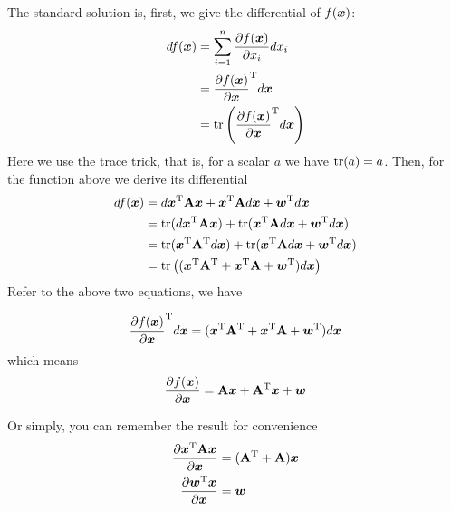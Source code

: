 \documentclass[a4paper, 12pt, answers]{exam} %
\begin{document}
\begin{questions}
\begin{solution}
	The standard solution is, first, we give the differential of $f(\bm{x})$:
	\begin{equation*}
	\begin{aligned}
	df(\bm{x}) &= \sum_{i=1}^n \frac{\partial f(\bm{x})}{\partial x_i}dx_i \\
	&= \frac{\partial f(\bm{x})}{\partial \bm{x}}^{\mathrm{T}} d\bm{x} \\
	&= \operatorname{tr} \left ( \frac{\partial f(\bm{x})}{\partial \bm{x}}^{\mathrm{T}} d\bm{x} \right )
	\end{aligned}
	\end{equation*}
	Here we use the trace trick, that is, for a scalar $a$ we have $\operatorname{tr}(a)=a$. Then, for the function above we derive its differential
	\begin{equation*}
	\begin{aligned}
	df(\bm{x}) &= d\bm{x}^{\mathrm{T}}\mathbf{A} \bm{x} + \bm{x}^{\mathrm{T}}\mathbf{A}d \bm{x} + \bm{w}^{\mathrm{T}} d \bm{x} \\
	&= \operatorname{tr}(d\bm{x}^{\mathrm{T}}\mathbf{A} \bm{x}) + \operatorname{tr}(\bm{x}^{\mathrm{T}}\mathbf{A} d \bm{x} + \bm{w}^{\mathrm{T}} d \bm{x}) \\
	&= \operatorname{tr}(\bm{x}^{\mathrm{T}}\mathbf{A}^{\mathrm{T}}d\bm{x}) + \operatorname{tr}(\bm{x}^{\mathrm{T}}\mathbf{A} d \bm{x} + \bm{w}^{\mathrm{T}} d \bm{x}) \\
	&= \operatorname{tr} \left ( (\bm{x}^{\mathrm{T}}\mathbf{A}^{\mathrm{T}}+ \bm{x}^{\mathrm{T}}\mathbf{A} +   \bm{w}^{\mathrm{T}})d \bm{x} \right )	
	\end{aligned}
	\end{equation*}
	Refer to the above two equations, we have
	
	\begin{equation*}
	\frac{\partial f(\bm{x})}{\partial \bm{x}}^{\mathrm{T}} d\bm{x} = (\bm{x}^{\mathrm{T}}\mathbf{A}^{\mathrm{T}}+ \bm{x}^{\mathrm{T}}\mathbf{A} +   \bm{w}^{\mathrm{T}})d \bm{x}
	\end{equation*}
	which means 
	\begin{equation*}
	\frac{\partial f(\bm{x})}{\partial \bm{x}} = \mathbf{A} \bm{x}+ \mathbf{A}^{\mathrm{T}}\bm{x} + \bm{w}
	\end{equation*}
	
	Or simply, you can remember the result for convenience
	\begin{equation*}
	\begin{aligned}
	\frac{\partial \bm{x}^{\mathrm{T}}\mathbf{A} \bm{x}}{\partial \bm{x}} &= (\mathbf{A}^{\mathrm{T}}+\mathbf{A})\bm{x} \\
	\frac{\partial \bm{w}^{\mathrm{T}} \bm{x}}{\partial \bm{x}} &= \bm{w}
	\end{aligned}
	\end{equation*}
	\end{solution}
	

\end{questions}
\end{document}
